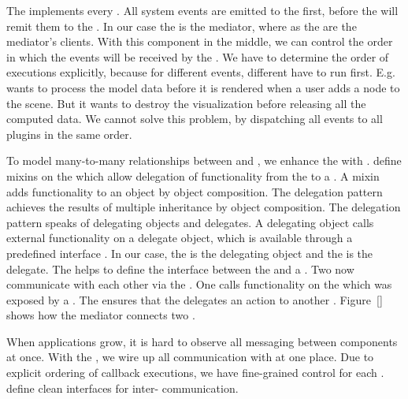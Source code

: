 \documentclass[../ClassicThesis.tex]{subfiles}
\begin{document}
The  implements every .
All system events are emitted to the 
first, before the  will remit them to the
. In our case the  is the
mediator, where as the  are the mediator's
clients. With this component in the middle, we can control
the order in which the events will be received by the
. We have to determine the order of
 executions explicitly, because for
different events, different  have to run
first. E.g. {\platener} wants to process the model data
before it is rendered when a user adds a node to the scene.
But it wants to destroy the visualization before releasing
all the computed data. We cannot solve this problem, by
dispatching all events to all plugins in the same order.

To model many-to-many relationships between 
and , we enhance the  with
.  define mixins on the
 which allow delegation of functionality
from the  to a . A mixin
adds functionality to an object by object
composition\cite{}. The
delegation pattern achieves the results of multiple
inheritance by object composition. The delegation pattern
speaks of delegating objects and delegates. A delegating
object calls external functionality on a delegate object,
which is available through a predefined interface
\cite{delegation}. In our case,
the  is the delegating object and the
 is the delegate. The  helps
to define the interface between the  and a
. Two  now communicate with
each other via the . One 
calls functionality on the  which was
exposed by a . The  ensures
that the  delegates an action to another
. Figure~\ref{} shows how the mediator connects two
.

When applications grow, it is hard to observe all messaging between
components at once. With the , we wire up all
communication with  at one place. Due to explicit
ordering of callback executions, we have fine-grained control for each
.  define clean interfaces for
inter- communication.
\end{document}
